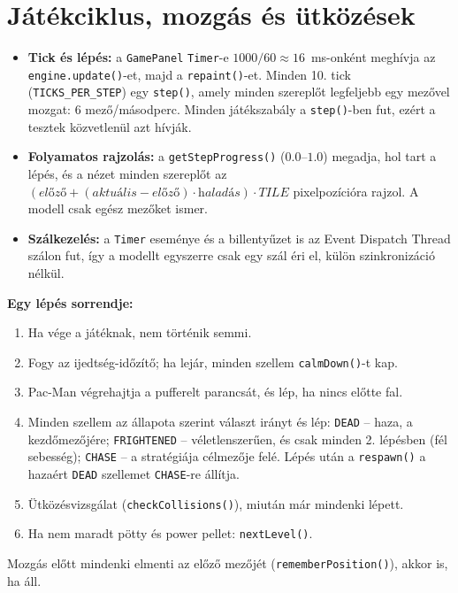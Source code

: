 \documentclass[11pt, a4paper]{article}
\begin{document}
\section{Játékciklus, mozgás és ütközések}
\label{sec:game_loop}
\begin{itemize}[itemsep=2pt]
    \item \textbf{Tick és lépés:} a \texttt{GamePanel} \texttt{Timer}-e $1000/60 \approx 16$~ms-onként meghívja az \texttt{engine.update()}-et, majd a \texttt{repaint()}-et. Minden 10. tick (\texttt{TICKS\_PER\_STEP}) egy \texttt{step()}, amely minden szereplőt legfeljebb egy mezővel mozgat: 6 mező/másodperc. Minden játékszabály a \texttt{step()}-ben fut, ezért a tesztek közvetlenül azt hívják.
    \item \textbf{Folyamatos rajzolás:} a \texttt{getStepProgress()} ($0.0$--$1.0$) megadja, hol tart a lépés, és a nézet minden szereplőt az $(\textit{előző} + (\textit{aktuális} - \textit{előző}) \cdot \textit{haladás}) \cdot \textit{TILE}$ pixelpozícióra rajzol. A modell csak egész mezőket ismer.
    \item \textbf{Szálkezelés:} a \texttt{Timer} eseménye és a billentyűzet is az Event Dispatch Thread szálon fut, így a modellt egyszerre csak egy szál éri el, külön szinkronizáció nélkül.
\end{itemize}

\textbf{Egy lépés sorrendje:}
\begin{enumerate}[itemsep=1pt]
    \item Ha vége a játéknak, nem történik semmi.
    \item Fogy az ijedtség-időzítő; ha lejár, minden szellem \texttt{calmDown()}-t kap.
    \item Pac-Man végrehajtja a pufferelt parancsát, és lép, ha nincs előtte fal.
    \item Minden szellem az állapota szerint választ irányt és lép: \texttt{DEAD} -- haza, a kezdőmezőjére; \texttt{FRIGHTENED} -- véletlenszerűen, és csak minden 2. lépésben (fél sebesség); \texttt{CHASE} -- a stratégiája célmezője felé. Lépés után a \texttt{respawn()} a hazaért \texttt{DEAD} szellemet \texttt{CHASE}-re állítja.
    \item Ütközésvizsgálat (\texttt{checkCollisions()}), miután már mindenki lépett.
    \item Ha nem maradt pötty és power pellet: \texttt{nextLevel()}.
\end{enumerate}
Mozgás előtt mindenki elmenti az előző mezőjét (\texttt{rememberPosition()}), akkor is, ha áll.
\end{document}
